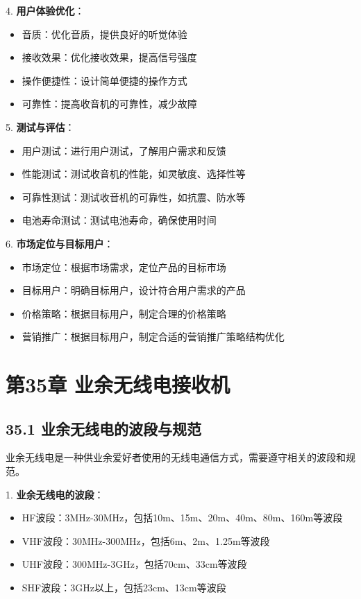 \documentclass[12pt,UTF8]{ctexbook}
\begin{document}
4. \textbf{用户体验优化}：
   \begin{itemize}[leftmargin=3.5em]
   \item 音质：优化音质，提供良好的听觉体验
   \item 接收效果：优化接收效果，提高信号强度
   \item 操作便捷性：设计简单便捷的操作方式
   \item 可靠性：提高收音机的可靠性，减少故障
   \end{itemize}

5. \textbf{测试与评估}：
   \begin{itemize}[leftmargin=3.5em]
   \item 用户测试：进行用户测试，了解用户需求和反馈
   \item 性能测试：测试收音机的性能，如灵敏度、选择性等
   \item 可靠性测试：测试收音机的可靠性，如抗震、防水等
   \item 电池寿命测试：测试电池寿命，确保使用时间
   \end{itemize}

6. \textbf{市场定位与目标用户}：
   \begin{itemize}[leftmargin=3.5em]
   \item 市场定位：根据市场需求，定位产品的目标市场
   \item 目标用户：明确目标用户，设计符合用户需求的产品
   \item 价格策略：根据目标用户，制定合理的价格策略
   \item 营销推广：根据目标用户，制定合适的营销推广策略结构优化
   \end{itemize}

\chapter*{第35章 业余无线电接收机}
\section*{35.1 业余无线电的波段与规范}

业余无线电是一种供业余爱好者使用的无线电通信方式，需要遵守相关的波段和规范。

1. \textbf{业余无线电的波段}：
   \begin{itemize}[leftmargin=3.5em]
   \item HF波段：3MHz-30MHz，包括10m、15m、20m、40m、80m、160m等波段
   \item VHF波段：30MHz-300MHz，包括6m、2m、1.25m等波段
   \item UHF波段：300MHz-3GHz，包括70cm、33cm等波段
   \item SHF波段：3GHz以上，包括23cm、13cm等波段
   \end{itemize}
\end{document}

